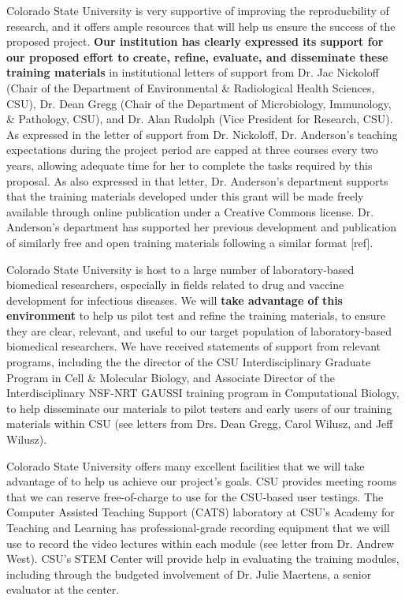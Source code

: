 \documentclass[pdftex,english,11pt,parskip=half]{scrartcl}
\begin{document}
Colorado State University is very supportive of improving the reproducbility of
research, and it offers ample resources that will help us ensure the success of
the proposed project. \textbf{Our institution has clearly expressed its support
for our proposed effort to create, refine, evaluate, and disseminate these
training materials} in institutional letters of support from Dr. Jac Nickoloff
(Chair of the Department of Environmental \& Radiological Health Sciences, CSU),
Dr. Dean Gregg (Chair of the Department of Microbiology, Immunology, \&
Pathology, CSU), and Dr. Alan Rudolph (Vice President for Research, CSU). As
expressed in the letter of support from Dr. Nickoloff, Dr. Anderson's teaching
expectations during the project period are capped at three courses every two
years, allowing adequate time for her to complete the tasks required by this
proposal. As also expressed in that letter, Dr. Anderson's department supports
that the training materials developed under this grant will be made freely
available through online publication under a Creative Commons license. Dr.
Anderson's department has supported her previous development and publication of
similarly free and open training materials following a similar format [ref].

Colorado State University is host to a large number of laboratory-based
biomedical researchers, especially in fields related to drug and vaccine
development for infectious diseases. We will \textbf{take advantage of this
environment} to help us pilot test and refine the training materials, to ensure
they are clear, relevant, and useful to our target population of
laboratory-based biomedical researchers. We have received statements of support
from relevant programs, including the the director of the CSU Interdisciplinary
Graduate Program in Cell \& Molecular Biology, and Associate Director of the
Interdisciplinary NSF-NRT GAUSSI training program in Computational Biology, to
help disseminate our materials to pilot testers and early users of our training
materials within CSU (see letters from Drs. Dean Gregg, Carol Wilusz, and Jeff
Wilusz). 

Colorado State University offers many excellent facilities that we will take
advantage of to help us achieve our project's goals. CSU provides meeting rooms
that we can reserve free-of-charge to use for the CSU-based user testings. The
Computer Assisted Teaching Support (CATS) laboratory at CSU's Academy for
Teaching and Learning has professional-grade recording equipment that we will
use to record the video lectures within each module (see letter from Dr. Andrew
West). CSU's STEM Center will provide help in evaluating the training modules,
including through the budgeted involvement of Dr. Julie Maertens, a senior
evaluator at the center. 
\end{document}
